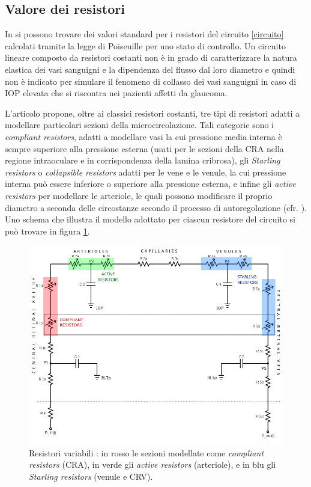 \documentclass{article}
\begin{document}
\subsection{Valore dei resistori}

In \cite{art1} si possono trovare dei valori standard per i resistori del circuito \ref{circuito} calcolati tramite la legge di Poiseuille per uno stato di controllo.
Un circuito lineare composto da resistori costanti non è in grado di caratterizzare la natura elastica dei vasi sanguigni e la dipendenza del flusso dal loro diametro e quindi non è indicato per simulare il fenomeno di collasso dei vasi sanguigni in caso di IOP elevata che si riscontra nei pazienti affetti da glaucoma.

L'articolo \cite{art1} propone, oltre ai classici resistori costanti, tre tipi di resistori adatti a modellare particolari sezioni della microcircolazione.
Tali categorie sono i \textit{compliant resistors}, adatti a modellare vasi la cui pressione media interna è sempre superiore alla pressione esterna (usati per le sezioni della CRA nella regione intraoculare e in corrispondenza della lamina cribrosa), gli \textit{Starling resistors} o \textit{collapsible resistors} adatti per le vene e le venule, la cui pressione interna può essere inferiore o superiore alla pressione esterna, e infine gli \textit{active resistors} per modellare le arteriole, le quali possono modificare il proprio diametro a seconda delle circostanze secondo il processo di autoregolazione (cfr. \cite{Tesi}). 
Uno schema che illustra il modello adottato per ciascun resistore del circuito si può trovare in figura \ref{circuitocolori}.

\begin{figure}[h]
\begin{center}
\includegraphics[width=1.0\textwidth]{Pictures/circuit2.png}
\caption{Resistori variabili \cite{art1}: in rosso le sezioni modellate come \textit{compliant resistors} (CRA), in verde gli \textit{active resistors} (arteriole), e in blu gli \textit{Starling resistors} (venule e CRV).}
\label{circuitocolori}
\end{center}
\end{figure}
\end{document}
